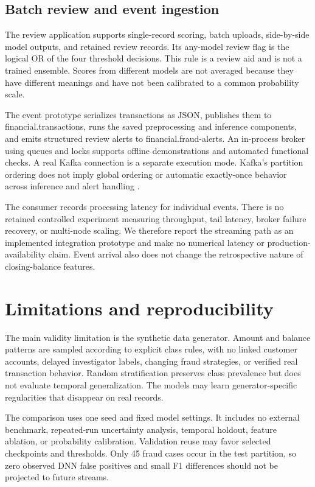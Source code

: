 \documentclass[conference]{IEEEtran}
\begin{document}
\subsection{Batch review and event ingestion}
The review application supports single-record scoring, batch uploads, side-by-side model outputs, and retained review records. Its any-model review flag is the logical OR of the four threshold decisions. This rule is a review aid and is not a trained ensemble. Scores from different models are not averaged because they have different meanings and have not been calibrated to a common probability scale.

The event prototype serializes transactions as JSON, publishes them to financial.transactions, runs the saved preprocessing and inference components, and emits structured review alerts to financial.fraud-alerts. An in-process broker using queues and locks supports offline demonstrations and automated functional checks. A real Kafka connection is a separate execution mode. Kafka's partition ordering does not imply global ordering or automatic exactly-once behavior across inference and alert handling \cite{r10}.

The consumer records processing latency for individual events. There is no retained controlled experiment measuring throughput, tail latency, broker failure recovery, or multi-node scaling. We therefore report the streaming path as an implemented integration prototype and make no numerical latency or production-availability claim. Event arrival also does not change the retrospective nature of closing-balance features.

\section{Limitations and reproducibility}
The main validity limitation is the synthetic data generator. Amount and balance patterns are sampled according to explicit class rules, with no linked customer accounts, delayed investigator labels, changing fraud strategies, or verified real transaction behavior. Random stratification preserves class prevalence but does not evaluate temporal generalization. The models may learn generator-specific regularities that disappear on real records.

The comparison uses one seed and fixed model settings. It includes no external benchmark, repeated-run uncertainty analysis, temporal holdout, feature ablation, or probability calibration. Validation reuse may favor selected checkpoints and thresholds. Only 45 fraud cases occur in the test partition, so zero observed DNN false positives and small F1 differences should not be projected to future streams.
\end{document}
